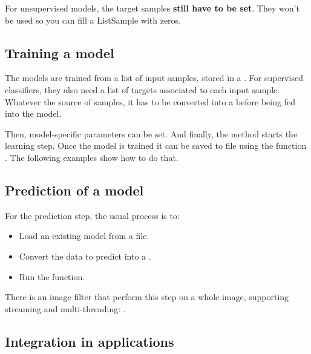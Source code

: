 For unsupervised models, the target samples \textbf{still have to be set}. They
won't be used so you can fill a ListSample with zeros.

\subsection{Training a model}

The models are trained from a list of input samples, stored in a
. For supervised classifiers, they
also need a list of targets associated to each input sample. Whatever the
source of samples, it has to be converted into a  before
being fed into the model.

Then, model-specific parameters can be set. And finally, the 
method starts the learning step. Once the model is trained it can be saved
to file using the function . The following examples show how
to do that.





\subsection{Prediction of a model}

For the prediction step, the usual process is to:
\begin{itemize}
\item Load an existing model from a file.
\item Convert the data to predict into a .
\item Run the  function.
\end{itemize}

There is an image filter that perform this step on a whole image, supporting
streaming and multi-threading: .

\ifitkFullVersion

\fi

\subsection{Integration in applications}

